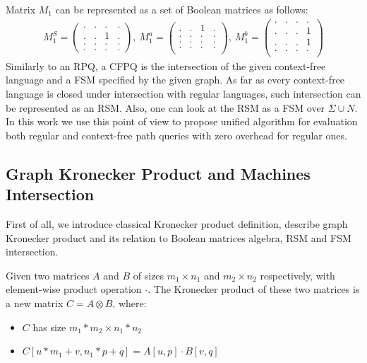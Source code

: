 Matrix $M_1$ can be represented as a set of Boolean matrices as follows:
{\small
\begin{align*}
M_1^S =
\begin{pmatrix}      
    . & . & . & .   \\
    . & . & 1 & .   \\
    . & . & . & .   \\
    . & . & . & .   
\end{pmatrix},~M_1^a =
\begin{pmatrix}       
   . & . & 1 & .   \\
   . & . & . & .   \\
   . & . & . & .   \\
   . & . & . & .   \\
\end{pmatrix},~M_1^b =
\begin{pmatrix}      
    . & . & . & .   \\
    . & . & . & 1   \\
    . & . & . & 1   \\
    . & . & . & .   \\
\end{pmatrix}
\end{align*}
}
Similarly to an RPQ, a CFPQ is the intersection of the given context-free language and a FSM specified by the given graph.
As far as every context-free language is closed under intersection with regular languages, such intersection can be represented as an RSM.
Also, one can look at the RSM as a FSM over $\Sigma \cup N$.
In this work we use this point of view to propose unified algorithm for evaluation both regular and context-free path queries with zero overhead for regular ones. 
 

\subsection{Graph Kronecker Product and Machines Intersection}

First of all, we introduce classical Kronecker product definition, describe graph Kronecker product and its relation to Boolean matrices algebra, RSM and FSM intersection.

\begin{definition}
Given two matrices $A$ and $B$ of sizes $m_1 \times n_1$ and $m_2 \times n_2$ respectively, with element-wise product operation $\cdot$. The Kronecker product of these two matrices is a new matrix $C = A \otimes B$, where: 
 \begin{itemize}
     \item $C$ has size $m_1 * m_2 \times n_1 * n_2$
     \item $C[u * m_1 + v,n_1 * p + q] = A[u,p] \cdot B[v,q]$
 \end{itemize}
\end{definition}

